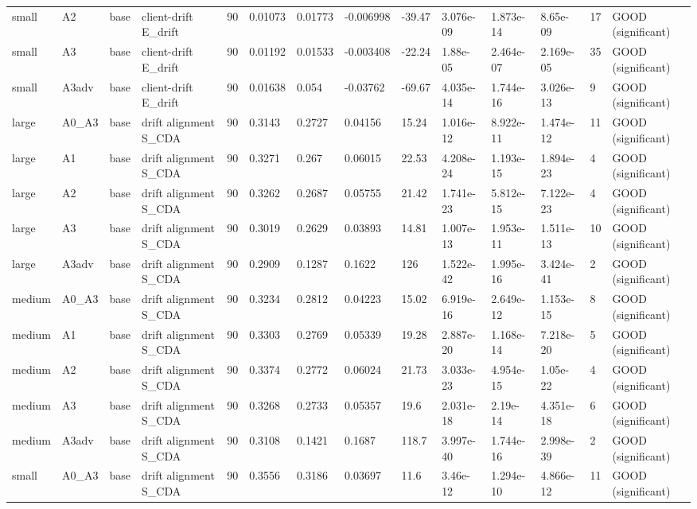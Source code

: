 \begin{table}[t]
\begin{tabular}{llllllllllllll}
small & A2 & base & client-drift E\_drift & 90 & 0.01073 & 0.01773 & -0.006998 & -39.47 & 3.076e-09 & 1.873e-14 & 8.65e-09 & 17 & GOOD (significant) \\
small & A3 & base & client-drift E\_drift & 90 & 0.01192 & 0.01533 & -0.003408 & -22.24 & 1.88e-05 & 2.464e-07 & 2.169e-05 & 35 & GOOD (significant) \\
small & A3adv & base & client-drift E\_drift & 90 & 0.01638 & 0.054 & -0.03762 & -69.67 & 4.035e-14 & 1.744e-16 & 3.026e-13 & 9 & GOOD (significant) \\
large & A0\_A3 & base & drift alignment S\_CDA & 90 & 0.3143 & 0.2727 & 0.04156 & 15.24 & 1.016e-12 & 8.922e-11 & 1.474e-12 & 11 & GOOD (significant) \\
large & A1 & base & drift alignment S\_CDA & 90 & 0.3271 & 0.267 & 0.06015 & 22.53 & 4.208e-24 & 1.193e-15 & 1.894e-23 & 4 & GOOD (significant) \\
large & A2 & base & drift alignment S\_CDA & 90 & 0.3262 & 0.2687 & 0.05755 & 21.42 & 1.741e-23 & 5.812e-15 & 7.122e-23 & 4 & GOOD (significant) \\
large & A3 & base & drift alignment S\_CDA & 90 & 0.3019 & 0.2629 & 0.03893 & 14.81 & 1.007e-13 & 1.953e-11 & 1.511e-13 & 10 & GOOD (significant) \\
large & A3adv & base & drift alignment S\_CDA & 90 & 0.2909 & 0.1287 & 0.1622 & 126 & 1.522e-42 & 1.995e-16 & 3.424e-41 & 2 & GOOD (significant) \\
medium & A0\_A3 & base & drift alignment S\_CDA & 90 & 0.3234 & 0.2812 & 0.04223 & 15.02 & 6.919e-16 & 2.649e-12 & 1.153e-15 & 8 & GOOD (significant) \\
medium & A1 & base & drift alignment S\_CDA & 90 & 0.3303 & 0.2769 & 0.05339 & 19.28 & 2.887e-20 & 1.168e-14 & 7.218e-20 & 5 & GOOD (significant) \\
medium & A2 & base & drift alignment S\_CDA & 90 & 0.3374 & 0.2772 & 0.06024 & 21.73 & 3.033e-23 & 4.954e-15 & 1.05e-22 & 4 & GOOD (significant) \\
medium & A3 & base & drift alignment S\_CDA & 90 & 0.3268 & 0.2733 & 0.05357 & 19.6 & 2.031e-18 & 2.19e-14 & 4.351e-18 & 6 & GOOD (significant) \\
medium & A3adv & base & drift alignment S\_CDA & 90 & 0.3108 & 0.1421 & 0.1687 & 118.7 & 3.997e-40 & 1.744e-16 & 2.998e-39 & 2 & GOOD (significant) \\
small & A0\_A3 & base & drift alignment S\_CDA & 90 & 0.3556 & 0.3186 & 0.03697 & 11.6 & 3.46e-12 & 1.294e-10 & 4.866e-12 & 11 & GOOD (significant) \\

\end{tabular}
\end{table}
